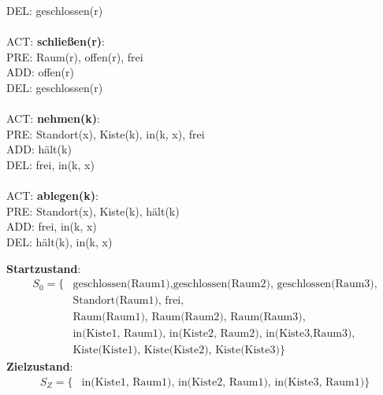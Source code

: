 \documentclass[a4paper,10pt]{article}
\begin{document}
\begin{enumerate}[~~a.)]
\begin{tabbing}
         \> DEL:   \> geschlossen(r) \\
    \\
    ACT: \> \textbf{schließen(r)}: \\
         \> PRE:   \> Raum(r), offen(r), frei \\
         \> ADD:   \> offen(r) \\
         \> DEL:   \> geschlossen(r) \\
    \\
    ACT: \> \textbf{nehmen(k)}: \\
         \> PRE:   \> Standort(x), Kiste(k), in(k, x), frei \\
         \> ADD:   \> hält(k) \\
         \> DEL:   \> frei, in(k, x) \\
    \\
    ACT: \> \textbf{ablegen(k)}: \\
         \> PRE:   \> Standort(x), Kiste(k), hält(k) \\
         \> ADD:   \> frei, in(k, x) \\
         \> DEL:   \> hält(k), in(k, x) \\
    \end{tabbing}
    \textbf{Startzustand}:
    \begin{align*}
    S_0 = \{&\textrm{geschlossen(Raum1),geschlossen(Raum2), geschlossen(Raum3),} \\
            &\textrm{Standort(Raum1), frei,} \\
            &\textrm{Raum(Raum1), Raum(Raum2), Raum(Raum3),} \\
            &\textrm{in(Kiste1, Raum1), in(Kiste2, Raum2), in(Kiste3,Raum3), }\\
            &\textrm{Kiste(Kiste1), Kiste(Kiste2), Kiste(Kiste3)}\}
    \end{align*}
    \textbf{Zielzustand}:
    \begin{align*}
    S_Z = \{&\textrm{in(Kiste1, Raum1), in(Kiste2, Raum1), in(Kiste3, Raum1)}\}
    \end{align*}
\end{enumerate}
\end{document}
